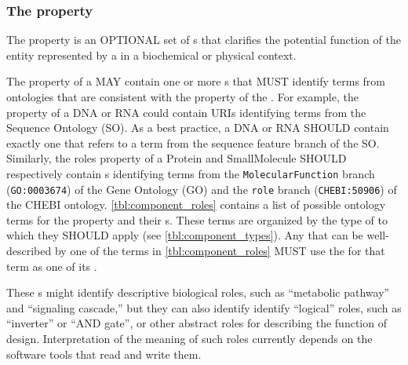 \subsubsection*{The  property}
\label{sec:roles:CD}

The  property is an OPTIONAL set of s that clarifies the potential function of the entity represented by a  in a biochemical or physical context.

The  property of a  MAY contain one or more s that MUST identify terms from ontologies that are consistent with the  property of the .
For example, the  property of a DNA or RNA  could contain URIs identifying terms from the Sequence Ontology (SO). As a best practice, a DNA or RNA  SHOULD contain exactly one  that refers to a term from the sequence feature branch of the SO.
Similarly, the roles property of a Protein and SmallMolecule  SHOULD respectively contain s identifying terms from the \texttt{MolecularFunction} branch (\texttt{GO:0003674}) of the Gene Ontology (GO) and the \texttt{role} branch (\texttt{CHEBI:50906}) of the CHEBI ontology.
\ref{tbl:component_roles} contains a list of possible ontology terms for the  property and their s. These terms are organized by the type of  to which they SHOULD apply (see \ref{tbl:component_types}). Any  that can be well-described by one of the terms in \ref{tbl:component_roles} MUST use the  for that term as one of its .

These s might identify descriptive biological roles, such as ``metabolic pathway'' and ``signaling cascade,'' but they can also identify identify ``logical'' roles, such as ``inverter'' or ``AND gate'', or other abstract roles for describing the function of design. Interpretation of the meaning of such roles currently depends on the software tools that read and write them.


